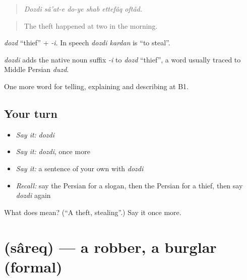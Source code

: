 \begin{quote}
\emph{Dozdi sâ'at-e do-ye shab ettefâq oftâd.}
\end{quote}

\begin{quote}
The theft happened at two in the morning.
\end{quote}

\emph{dozd} \textquotedblleft{}thief\textquotedblright{} + \emph{-i}. In speech \emph{dozdi kardan} is \textquotedblleft{}to steal\textquotedblright{}.

\begin{cousinweb}
\emph{dozdi} adds the native noun suffix \emph{-i} to \emph{dozd} \textquotedblleft{}thief\textquotedblright{}, a word usually traced to Middle Persian \emph{duzd}.
\end{cousinweb}

\begin{grammarlens}[title={What you've built}]
One more word for telling, explaining and describing at B1.
\end{grammarlens}

\subsection*{Your turn}
\begin{itemize}
\raggedright
  \item \emph{Say it:} \emph{dozdi}
  \item \emph{Say it:} \emph{dozdi}, once more
  \item \emph{Say it:} a sentence of your own with \emph{dozdi}
  \item \emph{Recall:} say the Persian for a slogan, then the Persian for a thief, then say \emph{dozdi} again
\end{itemize}

\begin{tcolorbox}[breakable,colback=teal!4,colframe=teal!35!black,title={Before you move on}]
What does  mean? (\textquotedblleft{}A theft, stealing\textquotedblright{}.) Say it once more.
\end{tcolorbox}
\section[\texorpdfstring{\fa{سارق} (sâreq)}{سارق (sâreq)}]{ (sâreq) — a robber, a burglar (formal)}

\label{lesson:FA-C316-sareq}



